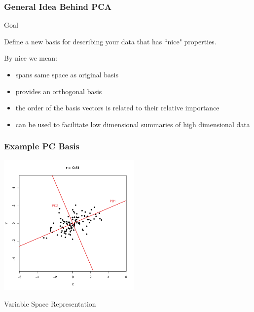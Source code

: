 \documentclass{beamer}
\begin{document}
\begin{frame}
  \frametitle{General Idea Behind PCA}


\begin{block}{Goal}

Define a new basis for describing your data that has ``nice" properties.

\end{block}
\medskip

By nice we mean:
\begin{itemize}
	\item spans same space as original basis
	\item provides an orthogonal basis
	\item the order of the basis vectors is related to their relative importance
	\item can be used to facilitate low dimensional summaries of high dimensional data
\end{itemize}


\end{frame}



\begin{frame}
  \frametitle{Example PC Basis}

\begin{center}
\includegraphics[height=2.75in]{fig-bivariate-pca.pdf}
\smallskip

Variable Space Representation

\end{center}  


\end{frame}
\end{document}
